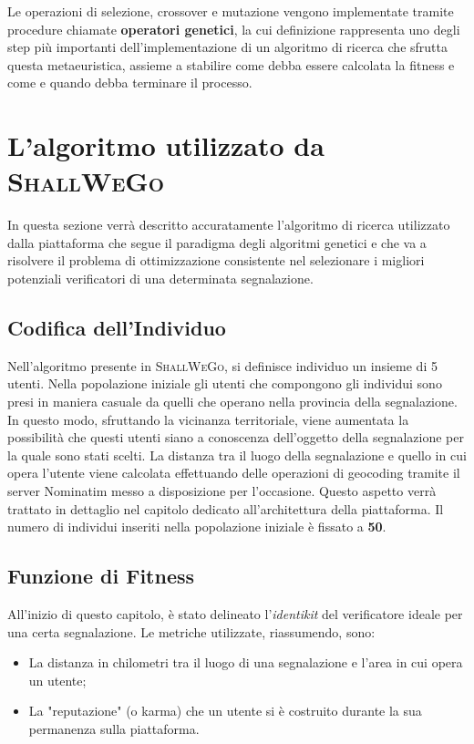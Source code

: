     Le operazioni di selezione, crossover e mutazione vengono implementate tramite procedure chiamate \textbf{operatori genetici}, la cui definizione rappresenta uno degli step più importanti dell'implementazione di un algoritmo di ricerca che sfrutta questa metaeuristica, assieme a stabilire come debba essere calcolata la fitness e come e quando debba terminare il processo. 

    \newpage

\section{L'algoritmo utilizzato da \textsc{ShallWeGo}}
    In questa sezione verrà descritto accuratamente l'algoritmo di ricerca utilizzato dalla piattaforma che segue il paradigma degli algoritmi genetici e che va a risolvere il problema di ottimizzazione consistente nel selezionare i migliori potenziali verificatori di una determinata segnalazione.

\subsection{Codifica dell'Individuo}
    Nell'algoritmo presente in \textsc{ShallWeGo}, si definisce individuo un insieme di 5 utenti. Nella popolazione iniziale gli utenti che compongono gli individui sono presi in maniera casuale da quelli che operano nella provincia della segnalazione. In questo modo, sfruttando la vicinanza territoriale, viene aumentata la possibilità che questi utenti siano a conoscenza dell'oggetto della segnalazione per la quale sono stati scelti. La distanza tra il luogo della segnalazione e quello in cui opera l'utente viene calcolata effettuando delle operazioni di geocoding tramite il server Nominatim messo a disposizione per l'occasione. Questo aspetto verrà trattato in dettaglio nel capitolo dedicato all'architettura della piattaforma. Il numero di individui inseriti nella popolazione iniziale è fissato a \textbf{50}.

\subsection{Funzione di Fitness}
    All'inizio di questo capitolo, è stato delineato l'\textit{identikit} del verificatore ideale per una certa segnalazione. Le metriche utilizzate, riassumendo, sono:

    \begin{itemize}
        \item La distanza in chilometri tra il luogo di una segnalazione e l'area in cui opera un utente;
        \item La "reputazione" (o karma) che un utente si è costruito durante la sua permanenza sulla piattaforma.
    \end{itemize}

